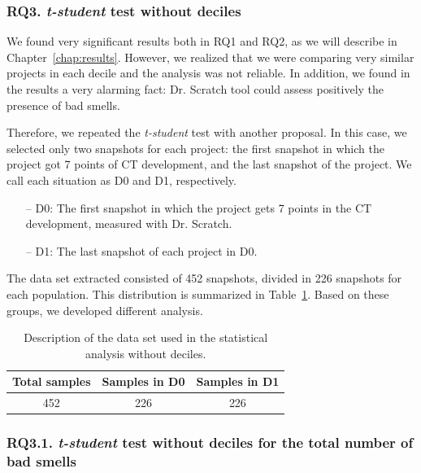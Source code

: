 \subsubsection{RQ3. \textit{t-student} test without deciles}
\label{subsubsec:rq3_t_student_no_deciles}

We found very significant results both in RQ1 and RQ2, as we will describe in Chapter~\ref{chap:results}. However, we realized that we were comparing very similar projects in each decile and the analysis was not reliable. In addition, we found in the results a very alarming fact: Dr. Scratch tool could assess positively the presence of bad smells. 

Therefore, we repeated the \textit{t-student} test with another proposal. In this case, we selected only two snapshots for each project: the first snapshot in which the project got 7 points of CT development, and the last snapshot of the project. We call each situation as D0 and D1, respectively.

\begin{itemize}
    \item[--] D0: The first snapshot in which the project gets 7 points in the CT development, measured with Dr. Scratch. 
    \item[--] D1: The last snapshot of each project in D0.
\end{itemize}

The data set extracted consisted of 452 snapshots, divided in 226 snapshots for each population. This distribution is summarized in Table~\ref{table:distribution_without_deciles}. Based on these groups, we developed different analysis.

\begin{table}
    \centering
    \begin{tabular}{|c|c|c|}
        \hline
        \textbf{Total samples} & \textbf{Samples in D0} & \textbf{Samples in D1} \\ \hline
        452 & 226 & 226 \\ \hline
    \end{tabular}
    \caption{Description of the data set used in the statistical analysis without deciles.}
    \label{table:distribution_without_deciles}
\end{table}

\subsubsection{RQ3.1. \textit{t-student} test without deciles for the total number of bad smells}
\label{subsubsec:RQ3_1_statistical}

